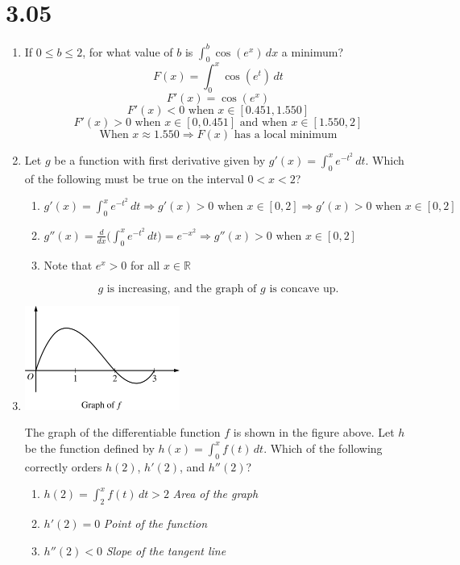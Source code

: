 \documentclass[12pt]{article}
\begin{document}
\section*{3.05}
\begin{enumerate}
    \item If $0\leq b \leq 2$, for what value of $b$ is $\int_{0}^{b} \cos(e^x) \, dx$ a minimum?
    $$F(x)=\int_{0}^{x} \cos(e^t) \, dt$$
    $$F'(x)=\cos(e^x) $$
  $$F'(x)<0 \text{ when } x\in[0.451,1.550]$$
  $$ F'(x)>0 \text{ when } x\in[0, 0.451] \text{ and when } x\in[1.550,2]$$
  $$\boxed{\text{When } x\approx 1.550 \Longrightarrow F(x) \text{ has a local minimum}}$$
  \newpage
    \item Let $g$ be a function with first derivative given by $g'(x)=\int_{0}^{x} e^{-t^2} \, dt$. Which of the following must be true on the interval $0<x<2$?
    \begin{enumerate}
        \item $g'(x)=\int_{0}^{x} e^{-t^2} \, dt \Longrightarrow g'(x)>0 \text{ when } x\in[0,2] \Longrightarrow g'(x)>0 \text{ when } x\in[0,2]$
        \item $g''(x)=\frac{d}{dx}\biggr(\int_{0}^{x} e^{-t^2}\, dt\biggr)=e^{-x^2} \Longrightarrow g''(x)>0 \text{ when } x\in[0,2]$
        \item Note that $e^{x}>0$ for all $x\in \mathbb{R}$
    \end{enumerate}
    $$\boxed{\text{$g$ is increasing, and the graph of $g$ is concave up.}}$$
    \item 
    \begin{center}
        \includegraphics[width=2in]{original-15.png}
    \end{center}
    The graph of the differentiable function $f$ is shown in the figure above. Let $h$ be the function defined by $h(x)=\int^{x}_{0}f(t)\,dt$. Which of the following correctly orders $h(2)$, $h'(2)$, and $h''(2)$?
    \begin{enumerate}
        \item $h(2) = \int^{x}_{2}f(t)\,dt >2$ \textit{Area of the graph}
        \item $h'(2)=0$ \textit{Point of the function}
        \item $h''(2)<0$ \textit{Slope of the tangent line}

\end{enumerate}
\end{enumerate}
\end{document}
